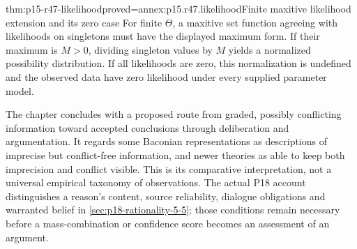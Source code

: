 \begin{hblemma}{thm:p15-r47-likelihood}{proved=annex:p15.r47.likelihood}{Finite maxitive likelihood extension and its zero case}
For finite \(\Theta\), a maxitive set function agreeing with likelihoods
on singletons must have the displayed maximum form. If their maximum is
\(M>0\), dividing singleton values by \(M\) yields a normalized
possibility distribution. If all likelihoods are zero, this normalization
is undefined and the observed data have zero likelihood under every supplied
parameter model.
\end{hblemma}

The chapter concludes with a proposed route from graded, possibly conflicting
information toward accepted conclusions through deliberation and
argumentation. It regards some Baconian representations as descriptions of
imprecise but conflict-free information, and newer theories as able to keep
both imprecision and conflict visible. This is its comparative interpretation,
not a universal empirical taxonomy of observations. The actual P18 account
distinguishes a reason's content, source reliability, dialogue obligations
and warranted belief in \cref{sec:p18-rationality-5-5}; those conditions
remain necessary before a mass-combination or confidence score becomes an
assessment of an argument.

